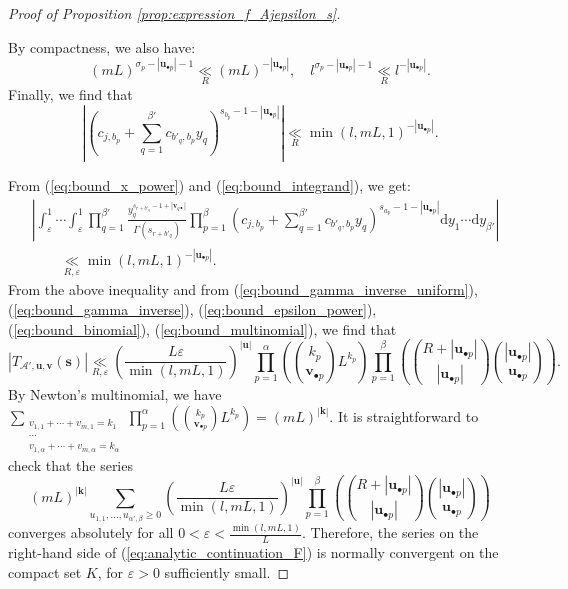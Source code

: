 \documentclass[a4paper]{amsart}
\theoremstyle{remark}
\theoremstyle{definition}
\newcommand{\dd}{\mathrm{d}}
\begin{document}
\begin{proof}[Proof of Proposition \ref{prop:expression_f_Ajepsilon_s}]
\begin{enumerate}
By compactness, we also have:
$$ (mL)^{\sigma_p-|\mathbf{u}_{\bullet p}|-1} \underset{R}{\ll} (mL)^{-|\mathbf{u}_{\bullet p}|}, \quad l^{\sigma_p-|\mathbf{u}_{\bullet p}|-1} \underset{R}{\ll} l^{-|\mathbf{u}_{\bullet p}|}. $$
Finally, we find that
\begin{equation}
    \left| \left(c_{j,b_p}+\sum_{q=1}^{\beta'} c_{b'_q,b_p} y_{q} \right)^{s_{b_p}-1-|\mathbf{u}_{\bullet p}|} \right| \underset{R}{\ll} \min(l,mL,1)^{-|\mathbf{u}_{\bullet p}|}. \label{eq:bound_integrand}
\end{equation}
\end{enumerate}
From (\ref{eq:bound_x_power}) and (\ref{eq:bound_integrand}), we get:
\begin{align*}
    & \left| \int_{\varepsilon}^{1} \cdots \int_{\varepsilon}^1 \prod_{q=1}^{\beta'} \frac{y_q^{s_{r+b'_q}-1+ |\mathbf{v}_{q \bullet}|}}{\Gamma(s_{r+b'_q})} \prod_{p=1}^{\beta} \left( c_{j,b_p}+\sum_{q=1}^{\beta'} c_{b'_q,b_p} y_{q} \right)^{s_{a_p}-1-|\mathbf{u}_{\bullet p}|} \dd y_1 \cdots \dd y_{\beta'} \right| \\ 
    & \qquad \underset{R,\varepsilon}{\ll} \min(l,mL,1)^{-|\mathbf{u}_{\bullet p}|}.
\end{align*}
From the above inequality and from (\ref{eq:bound_gamma_inverse_uniform}), (\ref{eq:bound_gamma_inverse}), (\ref{eq:bound_epsilon_power}), (\ref{eq:bound_binomial}), (\ref{eq:bound_multinomial}), we find that 
$$ |T_{\mathcal{A}',\mathbf{u},\mathbf{v}}(\mathbf{s})| \underset{R,\varepsilon}{\ll} \left(\frac{L\varepsilon}{\min(l,mL,1)} \right)^{|\mathbf{u}|} \prod_{p=1}^{\alpha} \left( \binom{k_p}{\mathbf{v}_{\bullet p}} L^{k_p} \right) \prod_{p=1}^{\beta} \left( \binom{R+|\mathbf{u}_{\bullet p}|}{|\mathbf{u}_{\bullet p}|} \binom{|\mathbf{u}_{\bullet p}|}{\mathbf{u}_{\bullet p}} \right).$$
By Newton's multinomial, we have $\displaystyle{\sum_{\substack{v_{1,1}+\cdots+v_{m,1}=k_1 \\ \cdots \\ v_{1,\alpha}+\cdots+v_{m,\alpha}=k_{\alpha}}} \prod_{p=1}^{\alpha} \left( \binom{k_p}{\mathbf{v}_{\bullet p}} L^{k_p} \right)=(mL)^{|\mathbf{k}|}}$. It is straightforward to check that the series 
$$ (mL)^{|\mathbf{k}|} \sum_{u_{1,1},\ldots,u_{\alpha',\beta} \geq 0} \left(\frac{L\varepsilon}{\min(l,mL,1)} \right)^{|\mathbf{u}|} \prod_{p=1}^{\beta} \left( \binom{R+|\mathbf{u}_{\bullet p}|}{|\mathbf{u}_{\bullet p}|} \binom{|\mathbf{u}_{\bullet p}|}{\mathbf{u}_{\bullet p}} \right) $$
converges absolutely for all $0 < \varepsilon < \frac{\min(l,mL,1)}{L}$. Therefore, the series on the right-hand side of (\ref{eq:analytic_continuation_F}) is normally convergent on the compact set $K$, for $\varepsilon>0$ sufficiently small.


\end{proof}
\end{document}
